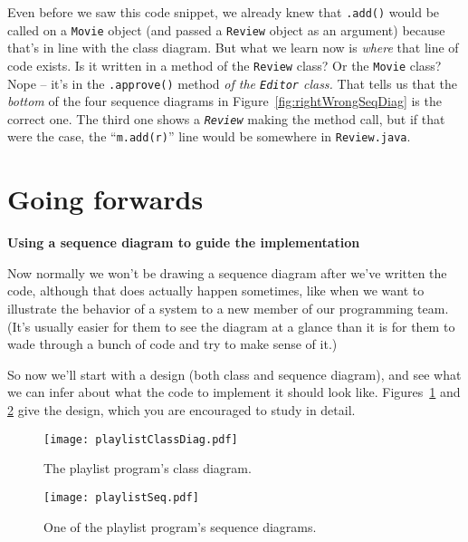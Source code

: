 \begin{enumerate}
Even before we saw this code snippet, we already knew that \texttt{.add()}
would be called on a \texttt{Movie} object (and passed a \texttt{Review}
object as an argument) because that's in line with the class diagram. But what
we learn now is \textit{where} that line of code exists. Is it written in a
method of the \texttt{Review} class? Or the \texttt{Movie} class? Nope -- it's
in the \texttt{.approve()} method \textit{of the \texttt{Editor} class.} That
tells us that the \textit{bottom} of the four sequence diagrams in
Figure~\ref{fig:rightWrongSeqDiag} is the correct one. The third one shows a
\textit{\texttt{Review}} making the method call, but if that were the case,
the ``\texttt{m.add(r)}'' line would be somewhere in \texttt{Review.java}.

\end{enumerate}

\section{Going forwards}

\vspace{-.2in}
{\large \textbf{Using a sequence diagram to guide the implementation}}

Now normally we won't be drawing a sequence diagram after we've written the
code, although that does actually happen sometimes, like when we want to
illustrate the behavior of a system to a new member of our programming team.
(It's usually easier for them to see the diagram at a glance than it is for
them to wade through a bunch of code and try to make sense of it.)

So now we'll start with a design (both class and sequence diagram), and see
what we can infer about what the code to implement it should look like.
Figures~\ref{fig:playlistClassDiag} and \ref{fig:playlistSeq} give the
design, which you are encouraged to study in detail.

\begin{figure}
\centering
\texttt{[image: playlistClassDiag.pdf]}
\caption{The playlist program's class diagram.}
\label{fig:playlistClassDiag}

\end{figure}
\begin{figure}
\centering
\hspace*{-1.2in}
\texttt{[image: playlistSeq.pdf]}
\vspace{.1in}
\caption{One of the playlist program's sequence diagrams.}
\quad\quad\quad\quad\quad %
\label{fig:playlistSeq}
\end{figure}

